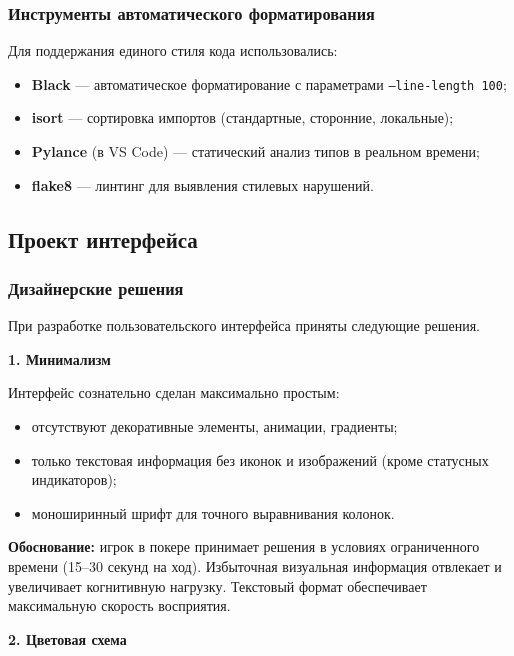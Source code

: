 \subsubsection*{Инструменты автоматического форматирования}

Для поддержания единого стиля кода использовались:
\begin{itemize}
    \item \textbf{Black} --- автоматическое форматирование с параметрами \texttt{--line-length 100};
    \item \textbf{isort} --- сортировка импортов (стандартные, сторонние, локальные);
    \item \textbf{Pylance} (в VS Code) --- статический анализ типов в реальном времени;
    \item \textbf{flake8} --- линтинг для выявления стилевых нарушений.
\end{itemize}

\subsection{Проект интерфейса}

\subsubsection*{Дизайнерские решения}

При разработке пользовательского интерфейса приняты следующие решения.

\textbf{1. Минимализм}

Интерфейс сознательно сделан максимально простым:
\begin{itemize}
    \item отсутствуют декоративные элементы, анимации, градиенты;
    \item только текстовая информация без иконок и изображений (кроме статусных индикаторов);
    \item моноширинный шрифт для точного выравнивания колонок.
\end{itemize}

\textbf{Обоснование:} игрок в покере принимает решения в условиях ограниченного времени (15--30 секунд на ход). Избыточная визуальная информация отвлекает и увеличивает когнитивную нагрузку. Текстовый формат обеспечивает максимальную скорость восприятия.

\textbf{2. Цветовая схема}

